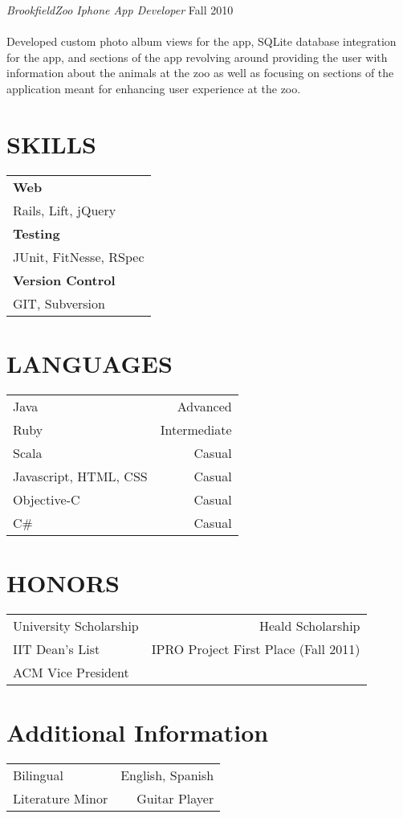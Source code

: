 \documentclass[margin]{res}
\newcommand{\tab}{\hspace*{2em}}
\begin{document}
\begin{resume}
               							 {\sl BrookfieldZoo Iphone App Developer} \hfill            Fall 2010 \\ \\
														\tab Developed custom photo album views for the app, SQLite database integration for the app, 
																 and sections of the app revolving around providing the user with information about the animals
																 at the zoo as well as focusing on sections of the application meant for enhancing user experience
																 at the zoo.
  
\section{SKILLS} 
		\begin{tabular}{ l }
		\bf Web \\
		\tab Rails, Lift, jQuery\\
		\bf Testing\\
		\tab JUnit, FitNesse, RSpec\\
		\bf Version Control\\
		\tab GIT, Subversion\\
		\end{tabular}

\section{LANGUAGES}
		\begin{tabular}{ l r }
  			Java & Advanced \\
 			Ruby & Intermediate \\
                   	Scala & Casual \\
                   	Javascript, HTML, CSS & Casual \\
                   	Objective-C & Casual \\
                 		C\# & Casual \\
		\end{tabular}
                 
\section{HONORS}
		\begin{tabular}{ l r }
  			University Scholarship & Heald Scholarship \\
 			IIT Dean's List & IPRO Project First Place (Fall 2011) \\
			ACM Vice President
		\end{tabular}
		
\section{Additional Information}
		\begin{tabular}{ l r }
  			Bilingual & English, Spanish \\
 			Literature Minor & Guitar Player
		\end{tabular}

\end{resume}
\end{document}
